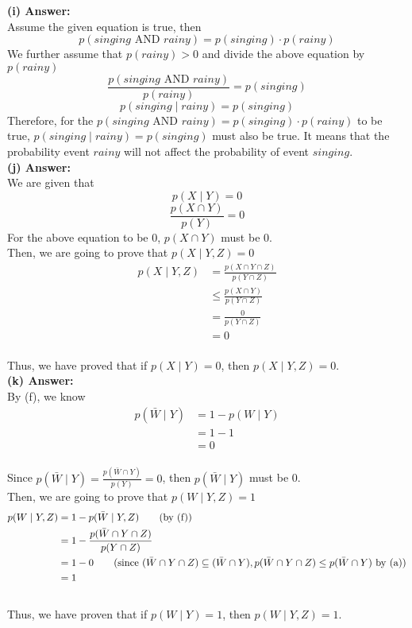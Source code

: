 \documentclass{article}
\begin{document}
\noindent
\textbf{(i) Answer:}\\
Assume the given equation is true, then
$$p(singing \text{ AND } rainy) = p(singing) \cdot p(rainy)$$
We further assume that $p(rainy) > 0$ and divide the above equation by $p(rainy)$
$$\frac{p(singing \text{ AND } rainy)}{p(rainy)} = p(singing)$$
$$p(singing \mid rainy) = p(singing)$$
Therefore, for the $p(singing \text{ AND } rainy) = p(singing) \cdot p(rainy)$ to be true, $p(singing \mid rainy) = p(singing)$ must also be true. It means that the probability event $rainy$ will not affect the probability of event $singing$.\\

\noindent
\textbf{(j) Answer:}\\
We are given that
$$p(X \mid Y) = 0$$
$$\frac{p(X \cap Y)}{p(Y)} = 0$$
For the above equation to be 0, $p(X \cap Y)$ must be 0.\\

\noindent
Then, we are going to prove that $p(X \mid Y, Z) = 0$
\begin{align*}
  p(X \mid Y, Z)
  &= \frac{p(X \cap Y \cap Z)}{p(Y \cap Z)}
  \\&\leq \frac{p(X \cap Y)}{p(Y \cap Z)}           \tag{by (a), $(X \cap Y \cap Z) \subseteq (X \cap Y)$, so $p(X \cap Y \cap Z) \leq p(X \cap Y)$}
  \\&= \frac{0}{p(Y \cap Z)}
  \\&= 0
\end{align*}\\
Thus, we have proved that if $p(X \mid Y) = 0$, then $p(X \mid Y, Z) = 0$.\\

\noindent
\textbf{(k) Answer:}\\
By (f), we know 
\begin{align*}
  p(\bar{W} \mid Y)
  &= 1 - p(W \mid Y)
  \\&= 1 - 1 
  \\&= 0
\end{align*}\\
Since $p(\bar{W} \mid Y) = \frac{p(\bar{W} \cap Y)}{p(Y)} = 0$, then $p(\bar{W} \mid Y)$ must be 0.\\ 

\noindent
Then, we are going to prove that $p(W \mid Y, Z) = 1$
\begin{align*}
  p(W \mid Y, Z)
  &= 1 - p(\bar{W} \mid Y, Z)       \tag{by (f)}
  \\&= 1 - \frac{p(\bar{W} \cap Y \cap Z)}{p(Y \cap Z)}
  \\&= 1 - 0        \tag{since $(\bar{W} \cap Y \cap Z) \subseteq (\bar{W} \cap Y), p(\bar{W} \cap Y \cap Z) \leq p(\bar{W} \cap Y)$ by (a)}
  \\&= 1
\end{align*}\\
Thus, we have proven that if $p(W \mid Y) = 1$, then $p(W \mid Y, Z) = 1$.\\
\end{document}
